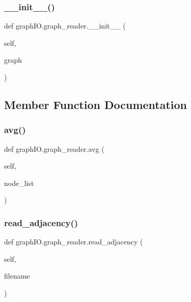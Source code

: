 \subsubsection{\+\_\+\+\_\+init\+\_\+\+\_\+()}
{\footnotesize\ttfamily def graph\+I\+O.\+graph\+\_\+reader.\+\_\+\+\_\+init\+\_\+\+\_\+ (\begin{DoxyParamCaption}\item[{}]{self,  }\item[{}]{graph }\end{DoxyParamCaption})}



\subsection{Member Function Documentation}
\mbox{\label{classgraph_i_o_1_1graph__reader_a8b981c3c0ae92d95bf93013adafbb949}} 
\subsubsection{avg()}
{\footnotesize\ttfamily def graph\+I\+O.\+graph\+\_\+reader.\+avg (\begin{DoxyParamCaption}\item[{}]{self,  }\item[{}]{node\+\_\+list }\end{DoxyParamCaption})}

\mbox{\label{classgraph_i_o_1_1graph__reader_a140fd99201863857edad3bc98e26edf0}} 
\subsubsection{read\+\_\+adjacency()}
{\footnotesize\ttfamily def graph\+I\+O.\+graph\+\_\+reader.\+read\+\_\+adjacency (\begin{DoxyParamCaption}\item[{}]{self,  }\item[{}]{filename }\end{DoxyParamCaption})}

\mbox{\label{classgraph_i_o_1_1graph__reader_aed93e74f041adc3d1ca15153eaff7ada}} 
